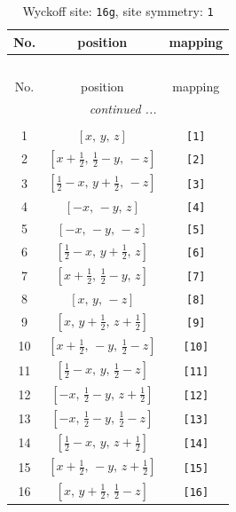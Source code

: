 \documentclass[fleqn,8pt]{jsarticle}
\begin{document}
\begin{longtable}{ccc}
\caption{Wyckoff site: {\tt 16g}, site symmetry: {\tt 1}}
 \\
 \hline \hline
No. & position & mapping \\ \hline \endfirsthead

\multicolumn{2}{l}{\tablename\ \thetable{}} \\
 \hline \hline
No. & position & mapping \\ \hline \endhead

 \hline \hline
\multicolumn{2}{r}{\footnotesize\it continued ...} \\ \endfoot

 \hline \hline
\multicolumn{2}{r}{} \\ \endlastfoot

1 & $\left[ x,\, y,\, z \right]$ & {\tt [1]} \\ \hline
2 & $\left[ x + \frac{1}{2},\, \frac{1}{2} - y,\, - z \right]$ & {\tt [2]} \\ \hline
3 & $\left[ \frac{1}{2} - x,\, y + \frac{1}{2},\, - z \right]$ & {\tt [3]} \\ \hline
4 & $\left[ - x,\, - y,\, z \right]$ & {\tt [4]} \\ \hline
5 & $\left[ - x,\, - y,\, - z \right]$ & {\tt [5]} \\ \hline
6 & $\left[ \frac{1}{2} - x,\, y + \frac{1}{2},\, z \right]$ & {\tt [6]} \\ \hline
7 & $\left[ x + \frac{1}{2},\, \frac{1}{2} - y,\, z \right]$ & {\tt [7]} \\ \hline
8 & $\left[ x,\, y,\, - z \right]$ & {\tt [8]} \\ \hline
9 & $\left[ x,\, y + \frac{1}{2},\, z + \frac{1}{2} \right]$ & {\tt [9]} \\ \hline
10 & $\left[ x + \frac{1}{2},\, - y,\, \frac{1}{2} - z \right]$ & {\tt [10]} \\ \hline
11 & $\left[ \frac{1}{2} - x,\, y,\, \frac{1}{2} - z \right]$ & {\tt [11]} \\ \hline
12 & $\left[ - x,\, \frac{1}{2} - y,\, z + \frac{1}{2} \right]$ & {\tt [12]} \\ \hline
13 & $\left[ - x,\, \frac{1}{2} - y,\, \frac{1}{2} - z \right]$ & {\tt [13]} \\ \hline
14 & $\left[ \frac{1}{2} - x,\, y,\, z + \frac{1}{2} \right]$ & {\tt [14]} \\ \hline
15 & $\left[ x + \frac{1}{2},\, - y,\, z + \frac{1}{2} \right]$ & {\tt [15]} \\ \hline
16 & $\left[ x,\, y + \frac{1}{2},\, \frac{1}{2} - z \right]$ & {\tt [16]} \\
\end{longtable}
\end{document}
